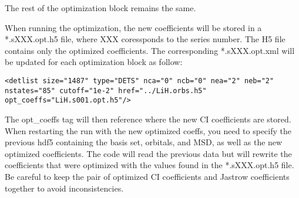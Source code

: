 The rest of the optimization block remains the same. 

When running the optimization, the new coefficients will be stored in a *.sXXX.opt.h5 file,  where XXX coressponds to the series number. The H5 file contains only the optimized coefficients. The corresponding *.sXXX.opt.xml  will be updated for each optimization block as follow: 
\begin{lstlisting}[style=QMCPXML]
<detlist size="1487" type="DETS" nca="0" ncb="0" nea="2" neb="2" nstates="85" cutoff="1e-2" href="../LiH.orbs.h5" opt_coeffs="LiH.s001.opt.h5"/>
\end{lstlisting}

The opt\_coeffs tag will then reference where the new CI coefficients are stored.\\

When restarting the run with the new optimized coeffs, you need to specify the previous hdf5 containing the basis set, orbitals,
and MSD, as well as the new optimized coefficients. The code will read the previous data but will rewrite the coefficients that
were optimized with the values found in the *.sXXX.opt.h5 file. Be careful to keep the pair of optimized CI coefficients and
Jastrow coefficients together to avoid inconsistencies.



